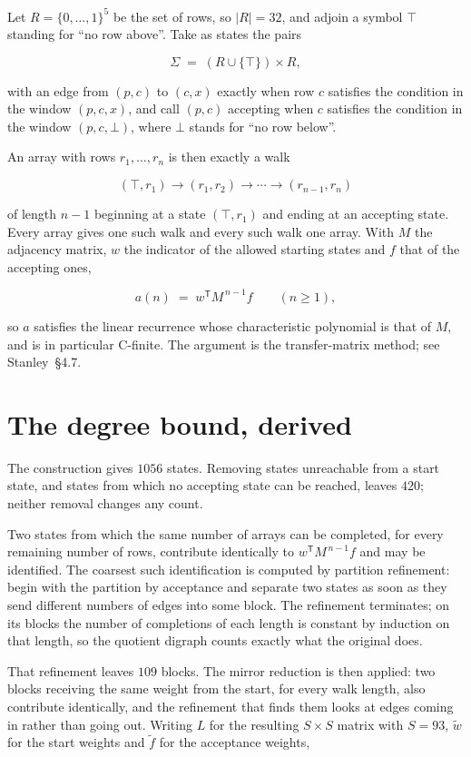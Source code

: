 \documentclass[11pt]{article}
\theoremstyle{definition}
\begin{document}
Let $R = \{0,\dots,1\}^{5}$ be the set of rows, so $|R| = 32$, and adjoin a symbol $\top$ standing for ``no row above''. Take as states the pairs

\[\Sigma \;=\; (R \cup \{\top\}) \times R,\]

with an edge from $(p,c)$ to $(c,x)$ exactly when row $c$ satisfies the condition in the window $(p,c,x)$, and call $(p,c)$ accepting when $c$ satisfies the condition in the window $(p,c,\bot)$, where $\bot$ stands for ``no row below''.

An array with rows $r_1,\dots,r_n$ is then exactly a walk

\[(\top,r_1) \to (r_1,r_2) \to \cdots \to (r_{n-1},r_n)\]

of length $n-1$ beginning at a state $(\top,r_1)$ and ending at an accepting state. Every array gives one such walk and every such walk one array. With $M$ the adjacency matrix, $w$ the indicator of the allowed starting states and $f$ that of the accepting ones,

\[a(n) \;=\; w^{\mathsf T} M^{\,n-1} f \qquad (n \ge 1),\]

so $a$ satisfies the linear recurrence whose characteristic polynomial is that of $M$, and is in particular C-finite. The argument is the transfer-matrix method; see Stanley~\S4.7.

\section{The degree bound, derived}

The construction gives $1056$ states. Removing states unreachable from a start state, and states from which no accepting state can be reached, leaves $420$; neither removal changes any count.

Two states from which the same number of arrays can be completed, for every remaining number of rows, contribute identically to $w^{\mathsf T}M^{\,n-1}f$ and may be identified. The coarsest such identification is computed by partition refinement: begin with the partition by acceptance and separate two states as soon as they send different numbers of edges into some block. The refinement terminates; on its blocks the number of completions of each length is constant by induction on that length, so the quotient digraph counts exactly what the original does.

That refinement leaves $109$ blocks. The mirror reduction is then applied: two blocks receiving the same weight from the start, for every walk length, also contribute identically, and the refinement that finds them looks at edges coming in rather than going out. Writing $L$ for the resulting $S \times S$ matrix with $S = 93$, $\tilde w$ for the start weights and $\tilde f$ for the acceptance weights,
\end{document}
